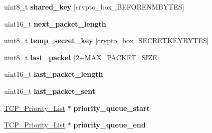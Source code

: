 \begin{DoxyCompactItemize}
\item 
\hypertarget{struct_t_c_p___client___connection_a81ead9fac55a0cedc30a96253a2c5119}{uint8\+\_\+t {\bfseries shared\+\_\+key} \mbox{[}crypto\+\_\+box\+\_\+\+B\+E\+F\+O\+R\+E\+N\+M\+B\+Y\+T\+E\+S\mbox{]}}\label{struct_t_c_p___client___connection_a81ead9fac55a0cedc30a96253a2c5119}

\item 
\hypertarget{struct_t_c_p___client___connection_a1d1e3047af3c935db36ae7b2360aaec7}{uint16\+\_\+t {\bfseries next\+\_\+packet\+\_\+length}}\label{struct_t_c_p___client___connection_a1d1e3047af3c935db36ae7b2360aaec7}

\item 
\hypertarget{struct_t_c_p___client___connection_a6de303feb7b7892cc6a38228554b3e78}{uint8\+\_\+t {\bfseries temp\+\_\+secret\+\_\+key} \mbox{[}crypto\+\_\+box\+\_\+\+S\+E\+C\+R\+E\+T\+K\+E\+Y\+B\+Y\+T\+E\+S\mbox{]}}\label{struct_t_c_p___client___connection_a6de303feb7b7892cc6a38228554b3e78}

\item 
\hypertarget{struct_t_c_p___client___connection_af7b6d103d243e4267b112f6efe1573e2}{uint8\+\_\+t {\bfseries last\+\_\+packet} \mbox{[}2+M\+A\+X\+\_\+\+P\+A\+C\+K\+E\+T\+\_\+\+S\+I\+Z\+E\mbox{]}}\label{struct_t_c_p___client___connection_af7b6d103d243e4267b112f6efe1573e2}

\item 
\hypertarget{struct_t_c_p___client___connection_a78d503fe4c8d935701480b58a0461775}{uint16\+\_\+t {\bfseries last\+\_\+packet\+\_\+length}}\label{struct_t_c_p___client___connection_a78d503fe4c8d935701480b58a0461775}

\item 
\hypertarget{struct_t_c_p___client___connection_a80b55fa7d5b8e4c3de6b51c99d7670cc}{uint16\+\_\+t {\bfseries last\+\_\+packet\+\_\+sent}}\label{struct_t_c_p___client___connection_a80b55fa7d5b8e4c3de6b51c99d7670cc}

\item 
\hypertarget{struct_t_c_p___client___connection_a5e19017835c72dc03d9dfd9a93abeb3c}{\hyperlink{struct_t_c_p___priority___list}{T\+C\+P\+\_\+\+Priority\+\_\+\+List} $\ast$ {\bfseries priority\+\_\+queue\+\_\+start}}\label{struct_t_c_p___client___connection_a5e19017835c72dc03d9dfd9a93abeb3c}

\item 
\hypertarget{struct_t_c_p___client___connection_a049dfdaebf54337c3024e077370c62d7}{\hyperlink{struct_t_c_p___priority___list}{T\+C\+P\+\_\+\+Priority\+\_\+\+List} $\ast$ {\bfseries priority\+\_\+queue\+\_\+end}}\label{struct_t_c_p___client___connection_a049dfdaebf54337c3024e077370c62d7}


\end{DoxyCompactItemize}
